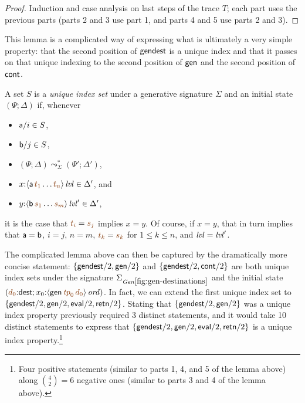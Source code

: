 \begin{proof}
  Induction and case analysis on last steps of the trace $T$; each
  part uses the previous parts (parts 2 and 3 use part 1, and parts 4
  and 5 use parts 2 and 3).
\end{proof}

This lemma is a complicated way of expressing what is ultimately a
very simple property: that the second position of ${\sf gendest}$ is a
unique index and that it passes on that unique indexing to the second
position of ${\sf gen}$ and the second position of ${\sf cont}$. 

\bigskip
\begin{definition}
A set $S$ is a {\em unique index set} under a generative signature
$\Sigma$ and an initial state $(\Psi; \Delta)$ if, whenever
\begin{itemize}
\item ${\sf a}/i \in S$, 
\item ${\sf b}/j \in S$, 
\item $(\Psi; \Delta) \leadsto^*_{\Sigma} (\Psi'; \Delta')$, 
\item $x{:}\islvl{\susp{{\sf a}\,\lf{t_1}\ldots \lf{t_n}}} \in \Delta'$, and
\item $y{:}\islvl{\susp{{\sf b}\,\lf{s_1}\ldots \lf{s_m}}}' \in \Delta'$,
\end{itemize}
it is the case that $\lf{t_i} = \lf{s_j}$ implies $x = y$. Of course, if
$x = y$, that in turn implies that ${\sf a} = {\sf b}$, 
$i = j$, $n = m$, $\lf{t_k} = \lf{s_k}$ for $1 \leq k \leq n$, and 
${\it lvl} = {\it lvl}'$. 
\end{definition}
\bigskip

The complicated lemma above can then be captured by the dramatically
more concise statement: $\{ {\sf gendest}/2, {\sf gen}/2 \}$ and $\{
{\sf gendest}/2, {\sf cont}/2 \}$ are both unique index sets under the
signature $\siggendests$ and the initial state $(\lf{d_0}{:}{\sf
  dest}; x_0{:}\istrue{\susp{{\sf gen}\,\lf{{\it
        tp}_0}\,\lf{d_0}}})$. In fact, we can extend the first unique
index set to $\{ {\sf gendest}/2, {\sf gen}/2, {\sf eval}/2, {\sf
  retn}/2 \}$. Stating that $\{ {\sf gendest}/2, {\sf gen}/2 \}$ was a
unique index property previously required 3 distinct statements, and
it would take 10 distinct statements to express that $\{ {\sf
  gendest}/2, {\sf gen}/2, {\sf eval}/2, {\sf retn}/2 \}$ is a unique
index property.\footnote{Four positive statements (similar to parts 1, 4, and 5 of the lemma above) along ${{4}\choose{2}} =
  6$ negative ones (similar to parts 3 and 4 of the lemma above).}

